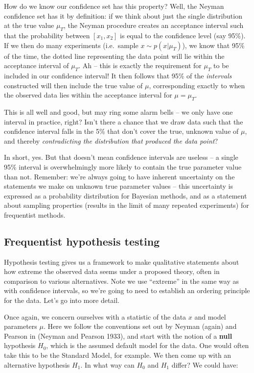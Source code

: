\documentclass[
  11pt,
  numbers=noendperiod]{book}
\begin{document}
How do we know our confidence set has this property? Well, the Neyman
confidence set has it by definition: if we think about just the single
distribution at the true value \(\mu_T\), the Neyman procedure creates
an acceptance interval such that the probability between \([x_1, x_2]\)
is equal to the confidence level (say 95\%). If we then do many
experiments (i.e.~sample \(x\sim p(x | \mu_T)\)), we know that 95\% of
the time, the dotted line representing the data point will lie within
the acceptance interval of \(\mu_T\). Ah -- this is exactly the
requirement for \(\mu_T\) to be included in our confidence interval! It
then follows that 95\% of the \emph{intervals} constructed will then
include the true value of \(\mu\), corresponding exactly to when the
observed data lies within the acceptance interval for \(\mu=\mu_T\).

This is all well and good, but may ring some alarm bells -- we only have
one interval in practice, right? Isn't there a chance that we draw data
such that the confidence interval falls in the 5\% that don't cover the
true, unknown value of \(\mu\), and thereby \emph{contradicting the
distribution that produced the data point}?

In short, yes. But that doesn't mean confidence intervals are useless --
a single 95\% interval is overwhelmingly more likely to contain the true
parameter value than not. Remember: we're always going to have inherent
uncertainty on the statements we make on unknown true parameter values
-- this uncertainty is expressed as a probability distribution for
Bayesian methods, and as a statement about sampling properties (results
in the limit of many repeated experiments) for frequentist methods.

\hypertarget{sec-hyptests}{%
\subsection{Frequentist hypothesis testing}\label{sec-hyptests}}

Hypothesis testing gives us a framework to make qualitative statements
about how extreme the observed data seems under a proposed theory, often
in comparison to various alternatives. Note we use ``extreme'' in the
same way as with confidence intervals, so we're going to need to
establish an ordering principle for the data. Let's go into more detail.

Once again, we concern ourselves with a statistic of the data \(x\) and
model parameters \(\mu\). Here we follow the conventions set out by
Neyman (again) and Pearson in (Neyman and Pearson 1933), and start with
the notion of a \textbf{null} hypothesis \(H_0\), which is the assumed
default model for the data. One would often take this to be the Standard
Model, for example. We then come up with an alternative hypothesis
\(H_1\). In what way can \(H_0\) and \(H_1\) differ? We could have:
\end{document}
